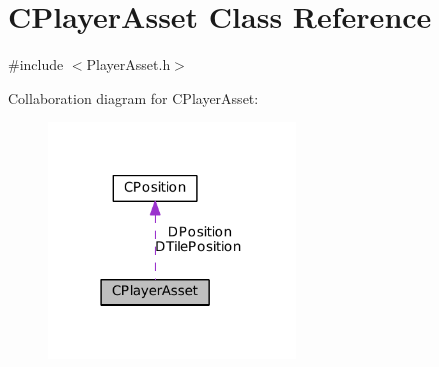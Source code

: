 \hypertarget{classCPlayerAsset}{}\section{C\+Player\+Asset Class Reference}
\label{classCPlayerAsset}


{\ttfamily \#include $<$Player\+Asset.\+h$>$}



Collaboration diagram for C\+Player\+Asset\+:
\nopagebreak
\begin{figure}[H]
\begin{center}
\leavevmode
\includegraphics[width=186pt]{classCPlayerAsset__coll__graph}
\end{center}
\end{figure}

